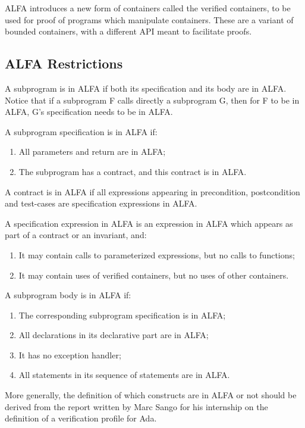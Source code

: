 \documentclass{article}
\begin{document}
ALFA introduces a new form of containers called the verified containers, to be
used for proof of programs which manipulate containers. These are a variant of
bounded containers, with a different API meant to facilitate proofs.

\subsection{ALFA Restrictions}

A subprogram is in ALFA if both its specification and its body are in
ALFA. Notice that if a subprogram F calls directly a subprogram G, then for F
to be in ALFA, G's specification needs to be in ALFA.

A subprogram specification is in ALFA if:
\begin{enumerate}
\item All parameters and return are in ALFA;
\item The subprogram has a contract, and this contract is in ALFA.
\end{enumerate}

A contract is in ALFA if all expressions appearing in precondition,
postcondition and test-cases are specification expressions in ALFA.

A specification expression in ALFA is an expression in ALFA which appears as
part of a contract or an invariant, and:
\begin{enumerate}
\item It may contain calls to parameterized expressions, but no calls to
  functions;
\item It may contain uses of verified containers, but no uses of other
  containers.
\end{enumerate}

A subprogram body is in ALFA if:
\begin{enumerate}
\item The corresponding subprogram specification is in ALFA;
\item All declarations in its declarative part are in ALFA;
\item It has no exception handler;
\item All statements in its sequence of statements are in ALFA.
\end{enumerate}

More generally, the definition of which constructs are in ALFA or not should be
derived from the report written by Marc Sango for his internship on the
definition of a verification profile for Ada.
\end{document}
